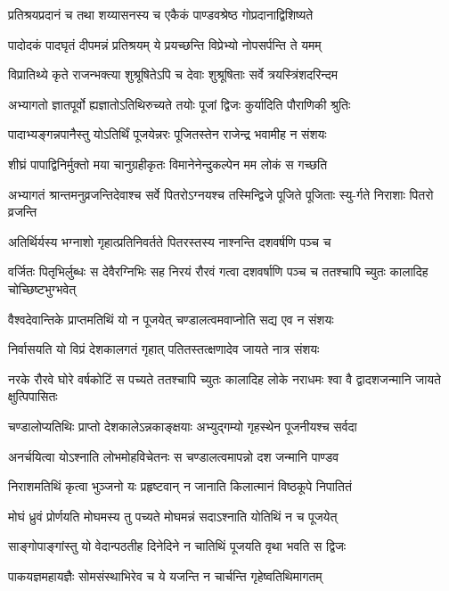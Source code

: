 \twolineshloka
{प्रतिश्रयप्रदानं च तथा शय्यासनस्य च}
{एकैकं पाण्डवश्रेष्ठ गोप्रदानाद्विशिष्यते}


\twolineshloka
{पादोदकं पादघृतं दीपमन्नं प्रतिश्रयम्}
{ये प्रयच्छन्ति विप्रेभ्यो नोपसर्पन्ति ते यमम्}


\twolineshloka
{विप्रातिथ्ये कृते राजन्भक्त्या शुश्रूषितेऽपि च}
{देवाः शुश्रूषिताः सर्वे त्रयस्त्रिंशदरिन्दम}


\twolineshloka
{अभ्यागतो ज्ञातपूर्वो ह्यज्ञातोऽतिथिरुच्यते}
{तयोः पूजां द्विजः कुर्यादिति पौराणिकी श्रुतिः}


\twolineshloka
{पादाभ्यङ्गन्नपानैस्तु योऽतिर्थिं पूजयेन्नरः}
{पूजितस्तेन राजेन्द्र भवामीह न संशयः}


\twolineshloka
{शीघ्रं पापाद्विनिर्मुक्तो मया चानुग्रहीकृतः}
{विमानेनेन्दुकल्पेन मम लोकं स गच्छति}


\twolineshloka
{अभ्यागतं श्रान्तमनुव्रजन्तिदेवाश्च सर्वे पितरोऽग्नयश्च}
{तस्मिन्द्विजे पूजिते पूजिताः स्यु-र्गते निराशाः पितरो व्रजन्ति}


\twolineshloka
{अतिर्थिर्यस्य भग्नाशो गृहात्प्रतिनिवर्तते}
{पितरस्तस्य नाश्नन्ति दशवर्षणि पञ्च च}


\threelineshloka
{वर्जितः पितृभिर्लुब्धः स देवैरग्निभिः सह}
{निरयं रौरवं गत्वा दशवर्षाणि पञ्च च}
{ततश्चापि च्युतः कालादिह चोच्छिष्टभुग्भवेत्}


\twolineshloka
{वैश्वदेवान्तिके प्राप्तमतिथिं यो न पूजयेत्}
{चण्डालत्वमवाप्नोति सद्य एव न संशयः}


\twolineshloka
{निर्वासयति यो विप्रं देशकालगतं गृहात्}
{पतितस्तत्क्षणादेव जायते नात्र संशयः}


\threelineshloka
{नरके रौरवे घोरे वर्षकोटिं स पच्यते}
{ततश्चापि च्युतः कालादिह लोके नराधमः}
{श्वा वै द्वादशजन्मानि जायते क्षुत्पिपासितः}


\twolineshloka
{चण्डालोप्यतिथिः प्राप्तो देशकालेऽन्नकाङ्क्षयाः}
{अभ्युद्गम्यो गृहस्थेन पूजनीयश्च सर्वदा}


\twolineshloka
{अनर्चयित्वा योऽश्नाति लोभमोहविचेतनः}
{स चण्डालत्वमापन्नो दश जन्मानि पाण्डव}


\twolineshloka
{निराशमतिथिं कृत्वा भुञ्जनो यः प्रहृष्टवान्}
{न जानाति किलात्मानं विष्ठकूपे निपातितं}


\twolineshloka
{मोघं ध्रुवं प्रोर्णयति मोघमस्य तु पच्यते}
{मोघमन्नं सदाऽश्नाति योतिथिं न च पूजयेत्}


\twolineshloka
{साङ्गोपाङ्गांस्तु यो वेदान्पठतीह दिनेदिने}
{न चातिथिं पूजयति वृथा भवति स द्विजः}


\twolineshloka
{पाकयज्ञमहायज्ञैः सोमसंस्थाभिरेव च}
{ये यजन्ति न चार्चन्ति गृहेष्वतिथिमागतम्}


